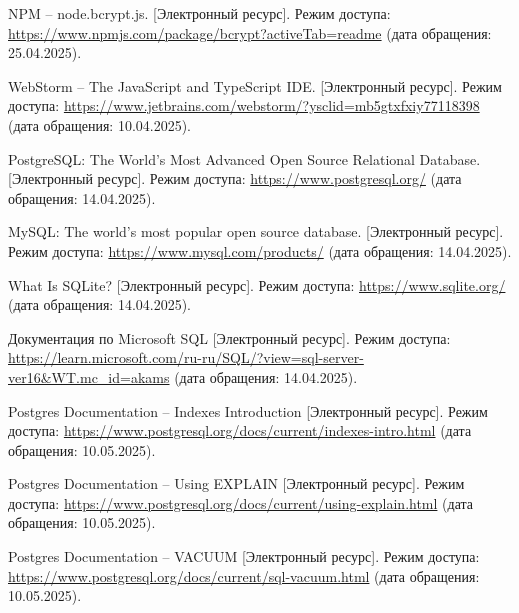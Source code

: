 \begin{thebibliography}{}
    NPM -- node.bcrypt.js. [Электронный ресурс]. Режим доступа: 
    \url{https://www.npmjs.com/package/bcrypt?activeTab=readme} (дата обращения: 25.04.2025).

    WebStorm -- The JavaScript and TypeScript IDE. [Электронный ресурс]. Режим доступа: 
    \url{https://www.jetbrains.com/webstorm/?ysclid=mb5gtxfxiy77118398} (дата обращения: 10.04.2025).

    PostgreSQL: The World's Most Advanced Open Source Relational Database. [Электронный ресурс]. Режим доступа: 
    \url{https://www.postgresql.org/} (дата обращения: 14.04.2025).

    MySQL: The world's most popular open source database. [Электронный ресурс]. Режим доступа: 
    \url{https://www.mysql.com/products/} (дата обращения: 14.04.2025).

    What Is SQLite? [Электронный ресурс]. Режим доступа: 
    \url{https://www.sqlite.org/} (дата обращения: 14.04.2025).

    Документация по Microsoft SQL [Электронный ресурс]. Режим доступа: 
    \url{https://learn.microsoft.com/ru-ru/SQL/?view=sql-server-ver16&WT.mc_id=akams} (дата обращения: 14.04.2025).

    Postgres Documentation -- Indexes Introduction [Электронный ресурс]. Режим доступа: 
    \url{https://www.postgresql.org/docs/current/indexes-intro.html} (дата обращения: 10.05.2025).

    Postgres Documentation -- Using EXPLAIN [Электронный ресурс]. Режим доступа: 
    \url{https://www.postgresql.org/docs/current/using-explain.html} (дата обращения: 10.05.2025).

    Postgres Documentation -- VACUUM [Электронный ресурс]. Режим доступа: 
    \url{https://www.postgresql.org/docs/current/sql-vacuum.html} (дата обращения: 10.05.2025).

\end{thebibliography}